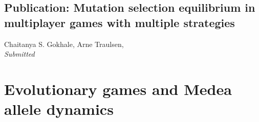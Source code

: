 \documentclass[oneside,11pt,a4paper]{book}
\begin{document}
\subsection{Publication: Mutation selection equilibrium in multiplayer games with multiple strategies}

Chaitanya S. Gokhale, Arne Traulsen,\\
\textit{Submitted}




\section{Evolutionary games and Medea allele dynamics}
\label{chap:medea}
\graphicspath{{Figs_Medea/}{Figs_Medea/}{Figs_Medea/}}
\end{document}
